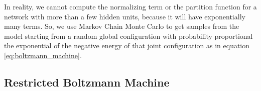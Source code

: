\documentclass{article}
\begin{document}
In reality, we cannot compute the normalizing term or the partition function for a network with more than a few hidden units, because it will have exponentially many terms. So, we use Markov Chain Monte Carlo to get samples from the model starting from a random global configuration with probability proportional the exponential of the negative energy of that joint configuration as in equation \ref{eq:boltzmann_machine}.

\subsection{Restricted Boltzmann Machine}
\end{document}
